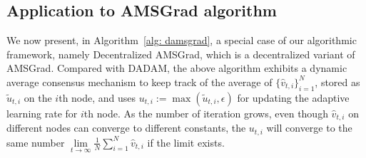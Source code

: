 \documentclass[anon,12pt]{colt2021} %
\begin{document}
\vspace{-0.05in}
\subsection{Application to AMSGrad algorithm}\label{sec:amsgrad}
\vspace{-0.05in}

We now present, in Algorithm~\ref{alg: damsgrad}, a special case of our algorithmic framework, namely Decentralized AMSGrad, which is a decentralized variant of AMSGrad.
Compared with DADAM, the above algorithm exhibits a dynamic average consensus mechanism to keep track of the average of $\{\hat v_{t,i}\}_{i=1}^N$, stored as $\tilde u_{t,i}$ on the $i$th node, and uses $u_{t,i} := \max(\tilde u_{t,i}, \epsilon)$ for updating the adaptive learning rate for $i$th node. 
As the number of iteration grows, even though $\hat v_{t,i}$ on different nodes can converge to different constants, the $u_{t,i}$ will converge to the same number $ \lim \limits_{t \rightarrow \infty} \frac{1}{N} \sum_{i=1}^N\hat v_{t,i} $ if the limit exists. 
\end{document}
